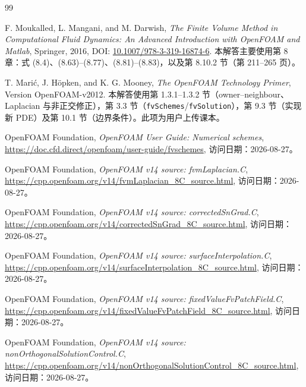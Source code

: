\documentclass[UTF8,a4paper,11pt]{ctexart}
\begin{document}
\begin{thebibliography}{99}

F. Moukalled, L. Mangani, and M. Darwish,
\textit{The Finite Volume Method in Computational Fluid Dynamics: An Advanced Introduction with OpenFOAM and Matlab},
Springer, 2016, DOI: \href{https://doi.org/10.1007/978-3-319-16874-6}{10.1007/978-3-319-16874-6}.
本解答主要使用第 8 章：式 (8.4)、(8.63)--(8.77)、(8.81)--(8.83)，以及第 8.10.2 节（第 211--265 页）。

T. Mari\'{c}, J. H\"opken, and K. G. Mooney,
\textit{The OpenFOAM Technology Primer}, Version OpenFOAM-v2012.
本解答使用第 1.3.1--1.3.2 节（owner--neighbour、Laplacian 与非正交修正），第 3.3 节（\texttt{fvSchemes}/\texttt{fvSolution}），第 9.3 节（实现新 PDE）及第 10.1 节（边界条件）。此项为用户上传课本。

OpenFOAM Foundation,
\textit{OpenFOAM User Guide: Numerical schemes},
\url{https://doc.cfd.direct/openfoam/user-guide/fvschemes},
访问日期：2026-08-27。

OpenFOAM Foundation,
\textit{OpenFOAM v14 source: fvmLaplacian.C},
\url{https://cpp.openfoam.org/v14/fvmLaplacian_8C_source.html},
访问日期：2026-08-27。

OpenFOAM Foundation,
\textit{OpenFOAM v14 source: correctedSnGrad.C},
\url{https://cpp.openfoam.org/v14/correctedSnGrad_8C_source.html},
访问日期：2026-08-27。

OpenFOAM Foundation,
\textit{OpenFOAM v14 source: surfaceInterpolation.C},
\url{https://cpp.openfoam.org/v14/surfaceInterpolation_8C_source.html},
访问日期：2026-08-27。

OpenFOAM Foundation,
\textit{OpenFOAM v14 source: fixedValueFvPatchField.C},
\url{https://cpp.openfoam.org/v14/fixedValueFvPatchField_8C_source.html},
访问日期：2026-08-27。

OpenFOAM Foundation,
\textit{OpenFOAM v14 source: nonOrthogonalSolutionControl.C},
\url{https://cpp.openfoam.org/v14/nonOrthogonalSolutionControl_8C_source.html},
访问日期：2026-08-27。

\end{thebibliography}
\end{document}
